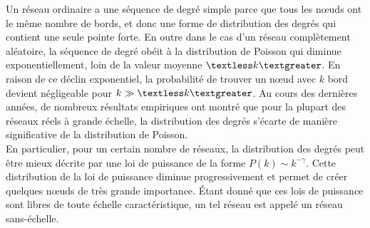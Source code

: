 Un réseau ordinaire a une séquence de degré simple parce que tous les nœuds ont le même nombre de bords, et donc une forme de distribution des degrés qui contient une seule pointe forte. En outre dans le cas d'un réseau complètement aléatoire, 
la séquence de degré obéit à la distribution de Poisson qui diminue exponentiellement, loin de la valeur moyenne $\textless k\textgreater$. En raison de ce déclin exponentiel, la probabilité de trouver un nœud avec $k$ bord devient négligeable pour  $k\gg \textless k\textgreater$.
Au cours des dernières années, de nombreux résultats empiriques ont montré que pour la plupart des réseaux réels à grande échelle, la distribution des degrés s'écarte de manière significative de la distribution de Poisson.\\
En particulier, pour un certain nombre de réseaux, la distribution des degrés peut être mieux décrite par une loi de puissance de la forme $P(k)\sim k^{-\gamma}$. Cette distribution de la loi de puissance diminue progressivement et permet de créer quelques nœuds de très grande importance. Étant donné que ces lois de puissance sont libres de toute échelle caractéristique, un tel réseau est appelé un réseau sans-échelle.

